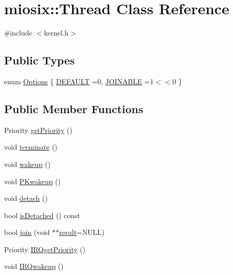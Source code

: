 \hypertarget{classmiosix_1_1_thread}{\section{miosix\-:\-:Thread Class Reference}
\label{classmiosix_1_1_thread}
}


{\ttfamily \#include $<$kernel.\-h$>$}

\subsection*{Public Types}
\begin{DoxyCompactItemize}
\item 
enum \hyperlink{classmiosix_1_1_thread_acaef68f0e93f6ad933442d87c210daaf}{Options} \{ \hyperlink{classmiosix_1_1_thread_acaef68f0e93f6ad933442d87c210daafa03df086cf889e215d75222d10486b71e}{D\-E\-F\-A\-U\-L\-T} =0, 
\hyperlink{classmiosix_1_1_thread_acaef68f0e93f6ad933442d87c210daafa785d69b0e6b95b648735efe54b588df7}{J\-O\-I\-N\-A\-B\-L\-E} =1$<$$<$0
 \}
\end{DoxyCompactItemize}
\subsection*{Public Member Functions}
\begin{DoxyCompactItemize}
\item 
Priority \hyperlink{classmiosix_1_1_thread_aacba6298a092d5335f6dbefe56a611ec}{get\-Priority} ()
\item 
void \hyperlink{classmiosix_1_1_thread_ae086b5bf2b3b55972ad696ec820c8f5e}{terminate} ()
\item 
void \hyperlink{classmiosix_1_1_thread_af19b8a2ab852ea771a2e2b95bb0ba2a8}{wakeup} ()
\item 
void \hyperlink{classmiosix_1_1_thread_a88af678dc4032a5f92da12917947d881}{P\-Kwakeup} ()
\item 
void \hyperlink{classmiosix_1_1_thread_ae7817dd59f317a04d3ce3793419d25a4}{detach} ()
\item 
bool \hyperlink{classmiosix_1_1_thread_afb1d97df689c7104bec35858bbaf4ae6}{is\-Detached} () const 
\item 
bool \hyperlink{classmiosix_1_1_thread_a968b43a36ecdf124d72a5d8ddfa2a3b9}{join} (void $\ast$$\ast$\hyperlink{classmiosix_1_1_thread_a448486b757b8ede4edaa8edc39962b17}{result}=N\-U\-L\-L)
\item 
Priority \hyperlink{classmiosix_1_1_thread_a585c7966f59855aafd771c7733a38296}{I\-R\-Qget\-Priority} ()
\item 
void \hyperlink{classmiosix_1_1_thread_ab34c3cbac8aa609a5c6e4abc384a9faa}{I\-R\-Qwakeup} ()
\end{DoxyCompactItemize}
